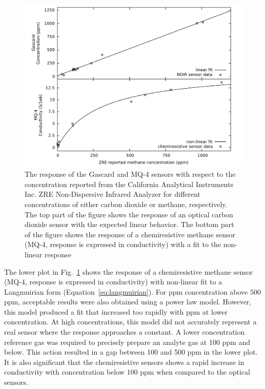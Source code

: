 \documentclass[preprint,sort&compress]{elsarticle}
\begin{document}
			\begin{figure}[!t]
				\centering
				\includegraphics[width=0.9\columnwidth]{honey9.pdf}
				\caption{The response of the Gascard and MQ-4 sensors with respect to the concentration reported from the California Analytical Instruments Inc. ZRE Non-Dispersive Infrared Analyzer for different concentrations of either carbon dioxide or methane, respectively.
					The top part of the figure shows the response of an optical carbon dioxide sensor with the expected linear behavior.
					The bottom part of the figure shows the response of a chemiresistive methane sensor (MQ-4, response is expressed in conductivity) with a fit to the non-linear response}
				\label{fig:gascardcodiff}
			\end{figure}
			
			The lower plot in Fig.~\ref{fig:gascardcodiff} shows the response of a chemiresistive methane sensor (MQ-4, response is expressed in conductivity) with non-linear fit to a  Langmuirian form  (Equation~\ref{eq:langmuirian}).
			For ppm concentration above 500 ppm, acceptable results were also obtained using a power law model. However, this model produced a fit that increased too rapidly with ppm at lower concentration.
			At high concentrations, this model did not accurately represent a real sensor where the response approaches a constant.
			A lower concentration reference gas was required to precisely prepare an analyte gas at 100 ppm and below.
			This action resulted in a gap between 100 and 500 ppm in the lower plot.
			It is also significant that the chemiresistive sensors shows a rapid increase in conductivity with concentration below 100 ppm when compared to the optical sensors.
			
\end{document}
